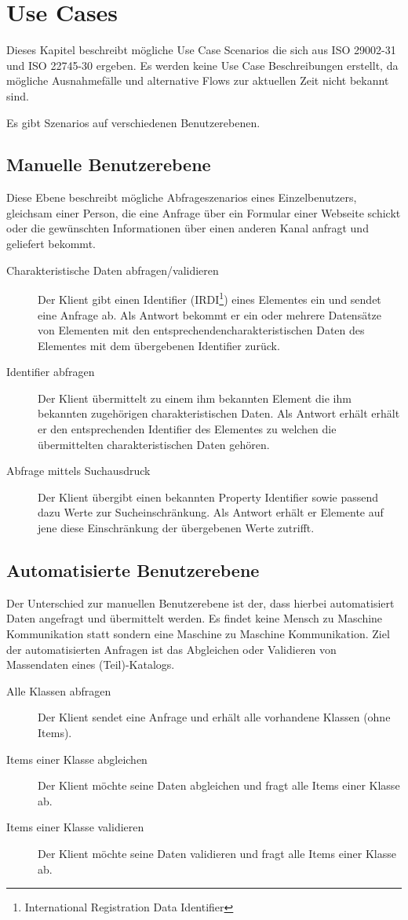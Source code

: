 \chapter{Use Cases}\label{Use Cases}

Dieses Kapitel beschreibt mögliche Use Case Scenarios die sich aus ISO 29002-31 und ISO 22745-30 ergeben. Es werden keine Use Case Beschreibungen erstellt, da mögliche Ausnahmefälle und alternative Flows zur aktuellen Zeit nicht bekannt sind. 

Es gibt Szenarios auf verschiedenen Benutzerebenen. 

\section{Manuelle Benutzerebene}
Diese Ebene beschreibt mögliche Abfrageszenarios eines Einzelbenutzers, gleichsam einer Person, die eine Anfrage über ein Formular einer Webseite schickt oder die gewünschten Informationen über einen anderen Kanal anfragt und geliefert bekommt. 

\begin{description}
\item[Charakteristische Daten abfragen/validieren] Der Klient gibt einen Identifier (IRDI\footnote{International Registration Data Identifier}) eines Elementes ein und sendet eine Anfrage ab. Als Antwort bekommt er ein oder mehrere Datensätze von Elementen mit den entsprechendencharakteristischen Daten des Elementes mit dem übergebenen Identifier zurück. 
\item[Identifier abfragen] Der Klient übermittelt zu einem ihm bekannten Element die ihm bekannten zugehörigen charakteristischen Daten. Als Antwort erhält erhält er den entsprechenden Identifier des Elementes zu welchen die übermittelten charakteristischen Daten gehören.
\item[Abfrage mittels Suchausdruck] Der Klient übergibt einen bekannten Property Identifier sowie passend dazu Werte zur Sucheinschränkung. Als Antwort erhält er Elemente auf jene diese Einschränkung der übergebenen Werte zutrifft. 
\end{description}

\section{Automatisierte Benutzerebene}
Der Unterschied zur manuellen Benutzerebene ist der, dass hierbei automatisiert Daten angefragt und übermittelt werden. Es findet keine Mensch zu Maschine Kommunikation statt sondern eine Maschine zu Maschine Kommunikation. 
Ziel der automatisierten Anfragen ist das Abgleichen oder Validieren von Massendaten eines (Teil)-Katalogs. 

\begin{description}
\item[Alle Klassen abfragen] Der Klient sendet eine Anfrage und erhält alle vorhandene Klassen (ohne Items).
\item[Items einer Klasse abgleichen] Der Klient möchte seine Daten abgleichen und fragt alle Items einer Klasse ab.  
\item[Items einer Klasse validieren] Der Klient möchte seine Daten validieren und fragt alle Items einer Klasse ab.
\end{description}